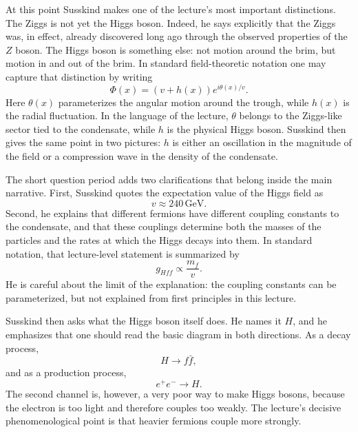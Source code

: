 At this point Susskind makes one of the lecture's most important distinctions. The Ziggs is not yet the Higgs boson. Indeed, he says explicitly that the Ziggs was, in effect, already discovered long ago through the observed properties of the \(Z\) boson. The Higgs boson is something else: not motion around the brim, but motion in and out of the brim. In standard field-theoretic notation one may capture that distinction by writing
\begin{equation}
\Phi(x)=(v+h(x))e^{i\theta(x)/v}.
\end{equation}
Here \(\theta(x)\) parameterizes the angular motion around the trough, while \(h(x)\) is the radial fluctuation. In the language of the lecture, \(\theta\) belongs to the Ziggs-like sector tied to the condensate, while \(h\) is the physical Higgs boson. Susskind then gives the same point in two pictures: \(h\) is either an oscillation in the magnitude of the field or a compression wave in the density of the condensate.

The short question period adds two clarifications that belong inside the main narrative. First, Susskind quotes the expectation value of the Higgs field as
\begin{equation}
v\approx 240\,\mathrm{GeV}.
\end{equation}
Second, he explains that different fermions have different coupling constants to the condensate, and that these couplings determine both the masses of the particles and the rates at which the Higgs decays into them. In standard notation, that lecture-level statement is summarized by
\begin{equation}
g_{Hff}\propto \frac{m_{f}}{v}.
\end{equation}
He is careful about the limit of the explanation: the coupling constants can be parameterized, but not explained from first principles in this lecture.

Susskind then asks what the Higgs boson itself does. He names it \(H\), and he emphasizes that one should read the basic diagram in both directions. As a decay process,
\begin{equation}
H\to f\bar f,
\end{equation}
and as a production process,
\begin{equation}
e^{+}e^{-}\to H.
\end{equation}
The second channel is, however, a very poor way to make Higgs bosons, because the electron is too light and therefore couples too weakly. The lecture's decisive phenomenological point is that heavier fermions couple more strongly.

